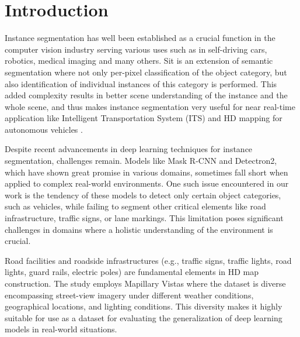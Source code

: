 \documentclass[conference]{IEEEtran}
\begin{document}
\section{Introduction}
Instance segmentation has well been established as a crucial function in the computer vision industry serving various uses such as in self-driving cars, robotics, medical imaging and many others. Sit is an extension of semantic segmentation where not only per-pixel classification of the object category, but also identification of individual instances of this category is performed. This added complexity results in better scene understanding of the instance and the whole scene, and thus makes instance segmentation very useful for near real-time application like Intelligent Transportation System (ITS) and HD mapping for autonomous vehicles \cite{1}.

Despite recent advancements in deep learning techniques for instance segmentation, challenges remain. Models like Mask R-CNN and Detectron2, which have shown great promise in various domains, sometimes fall short when applied to complex real-world environments. One such issue encountered in our work is the tendency of these models to detect only certain object categories, such as vehicles, while failing to segment other critical elements like road infrastructure, traffic signs, or lane markings. This limitation poses significant challenges in domains where a holistic understanding of the environment is crucial.

Road facilities and roadside infrastructures (e.g., traffic signs, traffic lights, road lights, guard rails, electric poles) are fundamental elements in HD map construction\cite{1}. The study employs Mapillary Vistas where the dataset is diverse encompassing street-view imagery under different weather conditions, geographical locations, and lighting conditions. This diversity makes it highly suitable for use as a dataset for evaluating the generalization of deep learning models in real-world situations.
\end{document}
